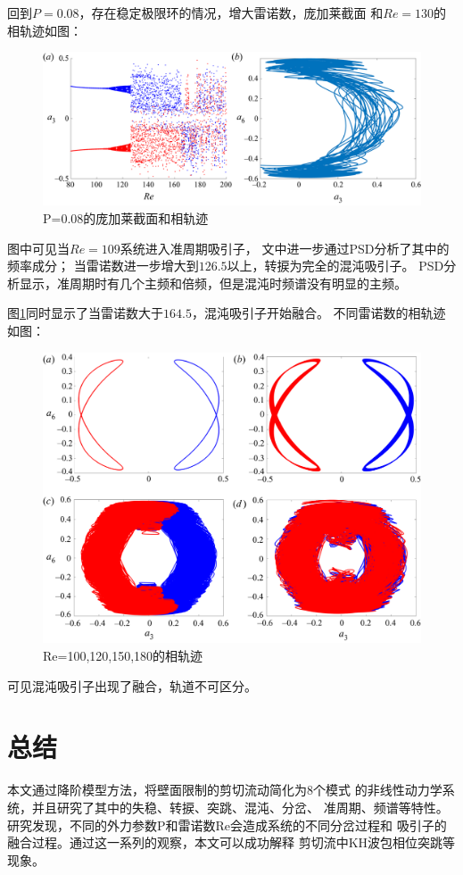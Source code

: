 \documentclass[UTF8,zihao=5]{ctexart} %
\begin{document}
回到$P=0.08$，存在稳定极限环的情况，增大雷诺数，庞加莱截面
和$Re=130$的相轨迹如图：
\begin{figure}[H]
    \centering
    \includegraphics[width=12cm]{fig13.png}  %
    \caption{P=0.08的庞加莱截面和相轨迹}
    \label{fig:fig13}
\end{figure}
图中可见当$Re=109$系统进入准周期吸引子，
文中进一步通过PSD分析了其中的频率成分；
当雷诺数进一步增大到$126.5$以上，转捩为完全的混沌吸引子。
PSD分析显示，准周期时有几个主频和倍频，但是混沌时频谱没有明显的主频。

图\ref{fig:fig13}同时显示了当雷诺数大于$164.5$，混沌吸引子开始融合。
不同雷诺数的相轨迹如图：
\begin{figure}[H]
    \centering
    \includegraphics[width=12cm]{fig17.png}  %
    \caption{Re=100,120,150,180的相轨迹}
    \label{fig:fig17}
\end{figure}
可见混沌吸引子出现了融合，轨道不可区分。

\section{总结}

本文通过降阶模型方法，将壁面限制的剪切流动简化为8个模式
的非线性动力学系统，并且研究了其中的失稳、转捩、突跳、混沌、分岔、
准周期、频谱等特性。
研究发现，不同的外力参数P和雷诺数Re会造成系统的不同分岔过程和
吸引子的融合过程。通过这一系列的观察，本文可以成功解释
剪切流中KH波包相位突跳等现象。
\end{document}
